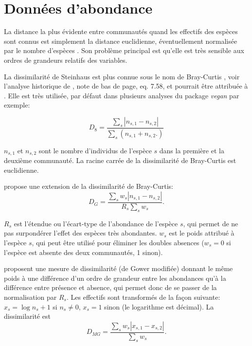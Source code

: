 \documentclass[
  11pt,
  french,
  a4paper,
  extrafontsizes,onecolumn,openright
  ]{memoir}
\begin{document}
\section{Données d'abondance}\label{donnuxe9es-dabondance}

La distance la plus évidente entre communautés quand les effectifs des espèces sont connus est simplement la distance euclidienne, éventuellement normalisée par le nombre d'espèces \autocite[Dissimilarité \(D_1\) de][]{Gower1986}.
Son problème principal est qu'elle est très sensible aux ordres de grandeurs relatifs des variables.

La dissimilarité de Steinhaus \autocite{Motyka1947} est plus connue sous le nom de Bray-Curtis \autocite{Odum1950,Bray1957}, voir l'analyse historique de \textcite{Legendre2012}, note de bas de page, eq. 7.58, et pourrait être attribuée à \textcite{Renkonen1938}.
Elle est très utilisée, par défaut dans plusieurs analyses du package \emph{vegan} par exemple:

\begin{equation}
  \label{eq:BrayCurtis}
  D_{8} = \frac{\sum_s{\left| n_{s,1}-n_{s,2} \right|}}{\sum_s{\left( n_{s,1}+n_{s,2}. \right)}}
\end{equation}

\(n_{s,1}\) et \(n_{s,2}\) sont le nombre d'individus de l'espèce \(s\) dans la première et la deuxième communauté.
La racine carrée de la dissimilarité de Bray-Curtis est euclidienne.

\textcite{Gower1971} propose une extension de la dissimilarité de Bray-Curtis:
\begin{equation}
  \label{eq:Gower1971}
  D_{G} = \frac{\sum_s{w_s\left| n_{s,1}-n_{s,2} \right|}}{R_s\sum_s{w_s}}.
\end{equation}

\(R_s\) est l'étendue ou l'écart-type de l'abondance de l'espèce \(s\), qui permet de ne pas surpondérer l'effet des espèces très abondantes.
\(w_s\) est le poids attribué à l'espèce \(s\), qui peut être utilisé pour éliminer les doubles absences (\(w_s=0\) si l'espèce est absente des deux communautés, 1 sinon).

\textcite{Anderson2006} proposent une mesure de dissimilarité (de Gower modifiée) donnant le même poids à une différence d'un ordre de grandeur entre les abondances qu'à la différence entre présence et absence, qui permet donc de se passer de la normalisation par \(R_s\).
Les effectifs sont transformés de la façon suivante: \(x_s=\log n_s +1\) si \(n_s \ne 0\), \(x_s=1\) sinon (le logarithme est décimal).
La dissimilarité est
\begin{equation}
  \label{eq:MG}
  D_{\mathit{MG}} = \frac{\sum_s{w_s\left| x_{s,1}-x_{s,2} \right|}}{\sum_s{w_s}}.
\end{equation}
\end{document}
